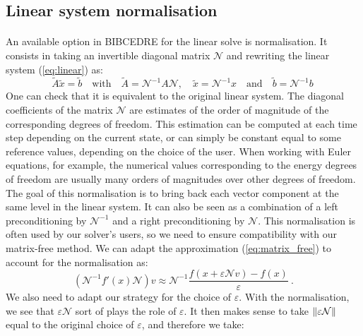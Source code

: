     \subsection{Linear system normalisation}

      \paragraph{}
      An available option in BIBCEDRE for the linear solve is normalisation.
      It consists in taking an invertible diagonal matrix $\mathcal{N}$ and rewriting the linear system (\ref{eq:linear}) as:
      \begin{equation}
        \tilde{A}\tilde{x} = \tilde{b}
        \quad\textrm{with}\quad \tilde{A} = \mathcal{N}^{-1} A \mathcal{N},
        \quad \tilde{x} = \mathcal{N}^{-1} x
        \quad\textrm{and}\quad \tilde{b} = \mathcal{N}^{-1} b \
      \end{equation}
      One can check that it is equivalent to the original linear system.
      The diagonal coefficients of the matrix $\mathcal{N}$ are estimates of the order of magnitude of the corresponding degrees of freedom.
      This estimation can be computed at each time step depending on the current state, or can simply be constant equal to some reference values, depending on the choice of the user.
      When working with Euler equations, for example, the numerical values corresponding to the energy degrees of freedom are usually many orders of magnitudes over other degrees of freedom.
      The goal of this normalisation is to bring back each vector component at the same level in the linear system.
      It can also be seen as a combination of a left preconditioning by $\mathcal{N}^{-1}$ and a right preconditioning by $\mathcal{N}$.
      This normalisation is often used by our solver's users, so we need to ensure compatibility with our matrix-free method.
      We can adapt the approximation (\ref{eq:matrix_free}) to account for the normalisation as:
      \begin{equation}
        \left( \mathcal{N}^{-1} f'\left(x\right) \mathcal{N} \right) v \approx \mathcal{N}^{-1} \frac{f\left(x + \varepsilon \mathcal{N} v\right) - f\left(x\right)}{\varepsilon} \ .
      \end{equation}
      We also need to adapt our strategy for the choice of $\varepsilon$.
      With the normalisation, we see that $\varepsilon \mathcal{N}$ sort of plays the role of $\varepsilon$.
      It then makes sense to take $\norm{\varepsilon \mathcal{N}}$ equal to the original choice of $\varepsilon$, and therefore we take:
